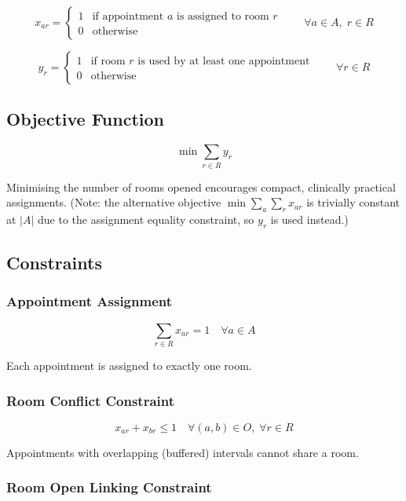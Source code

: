 \documentclass[12pt]{article}
\begin{document}
\[
x_{ar} =
\begin{cases}
1 & \text{if appointment } a \text{ is assigned to room } r \\
0 & \text{otherwise}
\end{cases}
\qquad \forall a \in A,\; r \in R
\]

\[
y_r =
\begin{cases}
1 & \text{if room } r \text{ is used by at least one appointment} \\
0 & \text{otherwise}
\end{cases}
\qquad \forall r \in R
\]

\subsection*{Objective Function}

\[
\min \sum_{r \in R} y_r
\]

Minimising the number of rooms opened encourages compact, clinically practical assignments.
(Note: the alternative objective $\min \sum_{a}\sum_{r} x_{ar}$ is trivially constant at $|A|$ due
to the assignment equality constraint, so $y_r$ is used instead.)

\subsection*{Constraints}

\subsubsection*{Appointment Assignment}

\[
\sum_{r \in R} x_{ar} = 1 \quad \forall a \in A
\]

Each appointment is assigned to exactly one room.

\subsubsection*{Room Conflict Constraint}

\[
x_{ar} + x_{br} \le 1 \quad \forall (a,b) \in O,\; \forall r \in R
\]

Appointments with overlapping (buffered) intervals cannot share a room.

\subsubsection*{Room Open Linking Constraint}
\end{document}
